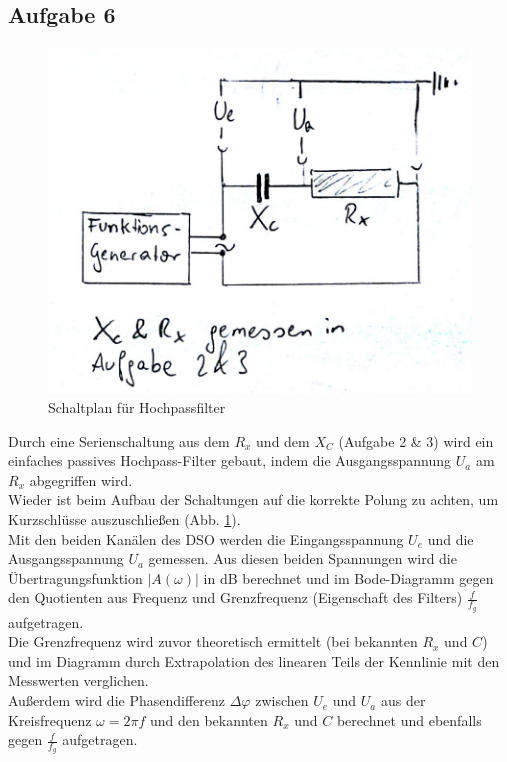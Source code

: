 \documentclass[12pt,a4paper]{article}
\begin{document}
\begin{multicols}{2}
\subsection{Aufgabe 6}

\begin{figure}[H]
	\centering
	\includegraphics[scale=0.6]{./figure/Schaltplan_Aufgabe6.png}
	\caption{Schaltplan für Hochpassfilter}
	\label{fig:plan_hochpass}
\end{figure}

Durch eine Serienschaltung aus dem $R_x$ und dem $X_C$ (Aufgabe 2 \& 3) wird ein einfaches passives Hochpass-Filter gebaut, indem die Ausgangsspannung $U_a$ am $R_x$ abgegriffen wird.\\
Wieder ist beim Aufbau der Schaltungen auf die korrekte Polung zu achten, um Kurzschlüsse auszuschließen (Abb. \ref{fig:plan_hochpass}).\\
Mit den beiden Kanälen des DSO werden die Eingangsspannung $U_e$ und die Ausgangsspannung $U_a$ gemessen. Aus diesen beiden Spannungen wird die Übertragungsfunktion $|A(\omega)|$ in dB berechnet und im Bode-Diagramm gegen den Quotienten aus Frequenz und Grenzfrequenz (Eigenschaft des Filters) $\frac{f}{f_g}$ aufgetragen.\\
Die Grenzfrequenz wird zuvor theoretisch ermittelt (bei bekannten $R_x$ und $C$) und im Diagramm durch Extrapolation des linearen Teils der Kennlinie mit den Messwerten verglichen.\\
Außerdem wird die Phasendifferenz $\Delta \varphi$ zwischen $U_e$ und $U_a$ aus der Kreisfrequenz $\omega = 2 \pi f$ und den bekannten $R_x$ und $C$ berechnet und ebenfalls gegen 
$\frac{f}{f_g}$ aufgetragen.


\end{multicols}
\end{document}
